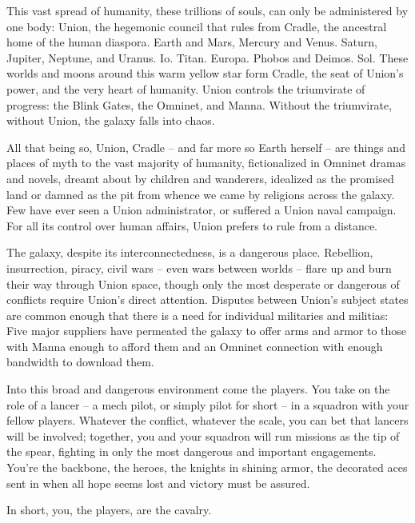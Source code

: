 This vast spread of humanity, these trillions of souls, can only be administered by one body:
Union, the hegemonic council that rules from Cradle, the ancestral home of the human diaspora.
Earth and Mars, Mercury and Venus. Saturn, Jupiter, Neptune, and Uranus. Io. Titan. Europa.
Phobos and Deimos. Sol. These worlds and moons around this warm yellow star form Cradle,
the seat of Union’s power, and the very heart of humanity. Union controls the triumvirate of
progress: the Blink Gates, the Omninet, and Manna. Without the triumvirate, without Union, the
galaxy falls into chaos.

All that being so, Union, Cradle -- and far more so Earth herself -- are things and places of myth
to the vast majority of humanity, fictionalized in Omninet dramas and novels, dreamt about by
children and wanderers, idealized as the promised land or damned as the pit from whence we
came by religions across the galaxy. Few have ever seen a Union administrator, or suffered a
Union naval campaign. For all its control over human affairs, Union prefers to rule from a
distance.

The galaxy, despite its interconnectedness, is a dangerous place. Rebellion, insurrection, piracy,
civil wars -- even wars between worlds -- flare up and burn their way through Union space,
though only the most desperate or dangerous of conflicts require Union’s direct attention.
Disputes between Union’s subject states are common enough that there is a need for individual
militaries and militias: Five major suppliers have permeated the galaxy to offer arms and armor to
those with Manna enough to afford them and an Omninet connection with enough bandwidth to
download them.

Into this broad and dangerous environment come the players. You take on the role of a lancer --
a mech pilot, or simply pilot for short -- in a squadron with your fellow players. Whatever the
conflict, whatever the scale, you can bet that lancers will be involved; together, you and your
squadron will run missions as the tip of the spear, fighting in only the most dangerous and
important engagements. You’re the backbone, the heroes, the knights in shining armor, the
decorated aces sent in when all hope seems lost and victory must be assured.

In short, you, the players, are the cavalry.